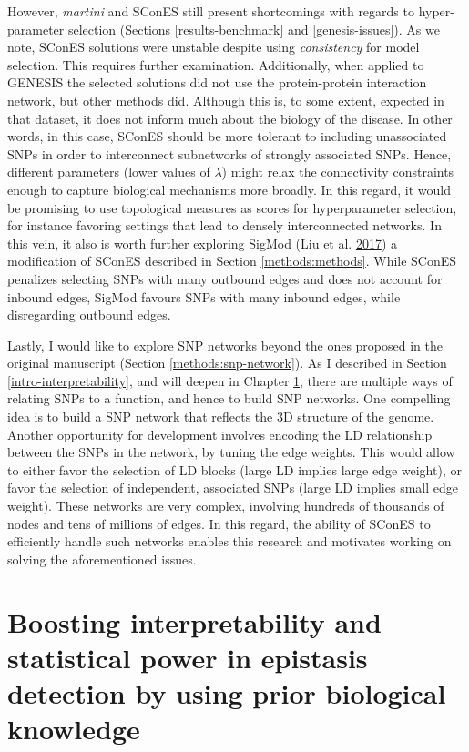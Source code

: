 \documentclass[
  11pt,
]{env/yjiao}
\begin{document}
However, \emph{martini} and SConES still present shortcomings with regards to hyper-parameter selection (Sections \ref{results-benchmark} and \ref{genesis-issues}). As we note, SConES solutions were unstable despite using \emph{consistency} for model selection. This requires further examination. Additionally, when applied to GENESIS the selected solutions did not use the protein-protein interaction network, but other methods did. Although this is, to some extent, expected in that dataset, it does not inform much about the biology of the disease. In other words, in this case, SConES should be more tolerant to including unassociated SNPs in order to interconnect subnetworks of strongly associated SNPs. Hence, different parameters (lower values of \(\lambda\)) might relax the connectivity constraints enough to capture biological mechanisms more broadly. In this regard, it would be promising to use topological measures as scores for hyperparameter selection, for instance favoring settings that lead to densely interconnected networks. In this vein, it also is worth further exploring SigMod (Liu et al. \protect\hyperlink{ref-liu_sigmod:_2017}{2017}) a modification of SConES described in Section \ref{methods:methods}. While SConES penalizes selecting SNPs with many outbound edges and does not account for inbound edges, SigMod favours SNPs with many inbound edges, while disregarding outbound edges.

Lastly, I would like to explore SNP networks beyond the ones proposed in the original manuscript (Section \ref{methods:snp-network}). As I described in Section \ref{intro-interpretability}, and will deepen in Chapter \ref{epi-snp2gene}, there are multiple ways of relating SNPs to a function, and hence to build SNP networks. One compelling idea is to build a SNP network that reflects the 3D structure of the genome. Another opportunity for development involves encoding the LD relationship between the SNPs in the network, by tuning the edge weights. This would allow to either favor the selection of LD blocks (large LD implies large edge weight), or favor the selection of independent, associated SNPs (large LD implies small edge weight). These networks are very complex, involving hundreds of thousands of nodes and tens of millions of edges. In this regard, the ability of SConES to efficiently handle such networks enables this research and motivates working on solving the aforementioned issues.

\hypertarget{epi-snp2gene}{%
\chapter{Boosting interpretability and statistical power in epistasis detection by using prior biological knowledge}\label{epi-snp2gene}}
\end{document}

